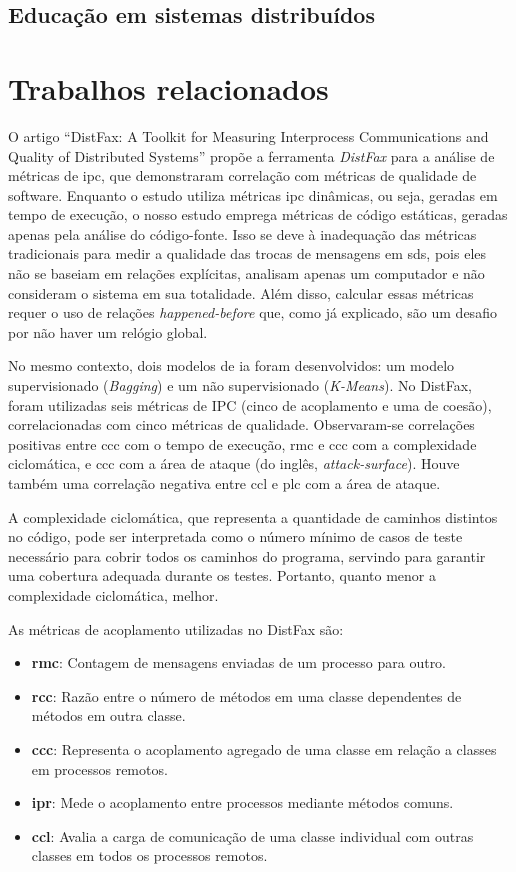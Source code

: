 \subsection{Educação em sistemas distribuídos}

\section{Trabalhos relacionados}
\label{section:related-work}

O artigo ``DistFax: A Toolkit for Measuring Interprocess Communications and Quality of Distributed Systems'' \cite{DistFax} propõe a ferramenta \textit{DistFax} para a análise de métricas de \gls{ipc}, que demonstraram correlação com métricas de qualidade de software. Enquanto o estudo utiliza métricas \gls{ipc} dinâmicas, ou seja, geradas em tempo de execução, o nosso estudo emprega métricas de código estáticas, geradas apenas pela análise do código-fonte. Isso se deve à inadequação das métricas tradicionais para medir a qualidade das trocas de mensagens em \gls{sds}, pois eles não se baseiam em relações explícitas, analisam apenas um computador e não consideram o sistema em sua totalidade. Além disso, calcular essas métricas requer o uso de relações \textit{happened-before} que, como já explicado, são um desafio por não haver um relógio global.

No mesmo contexto, dois modelos de \gls{ia} foram desenvolvidos: um modelo supervisionado (\textit{Bagging}) e um não supervisionado (\textit{K-Means}). No DistFax, foram utilizadas seis métricas de IPC (cinco de acoplamento e uma de coesão), correlacionadas com cinco métricas de qualidade. Observaram-se correlações positivas entre \gls{ccc} com o tempo de execução, \gls{rmc} e \gls{ccc} com a complexidade ciclomática, e \gls{ccc} com a área de ataque (do inglês, \textit{attack-surface}). Houve também uma correlação negativa entre \gls{ccl} e \gls{plc} com a área de ataque.

A complexidade ciclomática, que representa a quantidade de caminhos distintos no código, pode ser interpretada como o número mínimo de casos de teste necessário para cobrir todos os caminhos do programa, servindo para garantir uma cobertura adequada durante os testes. Portanto, quanto menor a complexidade ciclomática, melhor.

As métricas de acoplamento utilizadas no DistFax são:
\begin{itemize}
    \item \textbf{\gls{rmc}}: Contagem de mensagens enviadas de um processo para outro.
    \item \textbf{\gls{rcc}}: Razão entre o número de métodos em uma classe dependentes de métodos em outra classe.
    \item \textbf{\gls{ccc}}: Representa o acoplamento agregado de uma classe em relação a classes em processos remotos.
    \item \textbf{\gls{ipr}}: Mede o acoplamento entre processos mediante métodos comuns.
    \item \textbf{\gls{ccl}}: Avalia a carga de comunicação de uma classe individual com outras classes em todos os processos remotos.
\end{itemize}

